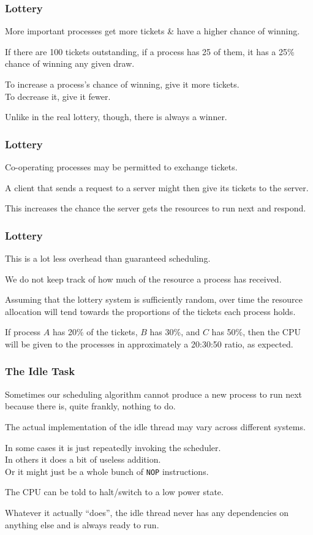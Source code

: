 \begin{frame}
\frametitle{Lottery}

More important processes get more tickets \& have a higher chance of winning. 

If there are 100 tickets outstanding, if a process has 25 of them, it has a 25\% chance of winning any given draw. 

To increase a process's chance of winning, give it more tickets.\\
\quad To decrease it, give it fewer. 

Unlike in the real lottery, though, there is always a winner.

\end{frame}

\begin{frame}
\frametitle{Lottery}

Co-operating processes may be permitted to exchange tickets. 

A client that sends a request to a server might then give its tickets to the server.

This increases the chance the server gets the resources to run next and respond.

\end{frame}

\begin{frame}
\frametitle{Lottery}

This is a lot less overhead than guaranteed scheduling. 

We do not keep track of how much of the resource a process has received. 

Assuming that the lottery system is sufficiently random, over time the resource allocation will tend towards the proportions of the tickets each process holds. 

If process $A$ has 20\% of the tickets, $B$ has 30\%, and $C$ has 50\%, then the CPU will be given to the processes in approximately a 20:30:50 ratio, as expected.


\end{frame}

\begin{frame}
\frametitle{The Idle Task}

Sometimes our scheduling algorithm cannot produce a new process to run next because there is, quite frankly, nothing to do. 

The actual implementation of the idle thread may vary across different systems. 

In some cases it is just repeatedly invoking the scheduler.\\
\quad In others it does a bit of useless addition.\\
\quad Or it might just be a whole bunch of \texttt{NOP} instructions. 

The CPU can be told to halt/switch to a low power state. 

Whatever it actually ``does'', the idle thread never has any dependencies on anything else and is always ready to run.

\end{frame}

